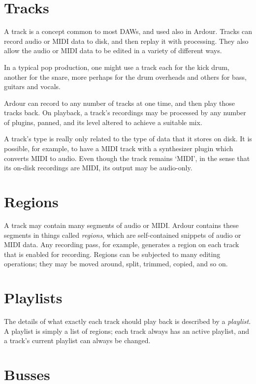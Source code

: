 \documentclass{book}
\begin{document}
\section{Tracks}

A track is a concept common to most DAWs, and used also in Ardour.
Tracks can record audio or MIDI data to disk, and then replay it with
processing.  They also allow the audio or MIDI data to be edited in a
variety of different ways.

In a typical pop production, one might use a track each for the kick
drum, another for the snare, more perhaps for the drum overheads and
others for bass, guitars and vocals.

Ardour can record to any number of tracks at one time, and then play
those tracks back.  On playback, a track's recordings may be processed
by any number of plugins, panned, and its level altered to achieve a
suitable mix.

\begin{danger}
A track's type is really only related to the type of data that it
stores on disk.  It is possible, for example, to have a MIDI track
with a synthesizer plugin which converts MIDI to audio.  Even though
the track remains `MIDI', in the sense that its on-disk recordings are
MIDI, its output may be audio-only.
\end{danger}


\section{Regions}

A track may contain many segments of audio or MIDI\@.  Ardour contains
these segments in things called \emph{regions}, which are
self-contained snippets of audio or MIDI data.  Any recording pass,
for example, generates a region on each track that is enabled for
recording.  Regions can be subjected to many editing operations; they
may be moved around, split, trimmed, copied, and so on.


\section{Playlists}

The details of what exactly each track should play back is described
by a \emph{playlist}.  A playlist is simply a list of regions; each
track always has an active playlist, and a track's current playlist
can always be changed.


\section{Busses}
\end{document}

